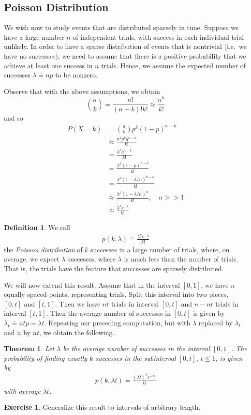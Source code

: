 \documentclass[12pt]{amsbook}
\theoremstyle{plain}
\newtheorem{theorem}{Theorem}
\theoremstyle{definition}
\newtheorem*{definition}{Definition}
\newtheorem*{exercise}{Exercise}
\theoremstyle{remark}
\numberwithin{equation}{section}  %
\numberwithin{equation}{section}  %
\begin{document}
\subsection{Poisson Distribution}
We wish now to study events that are distributed sparsely in time.
Suppose we have a large number $n$ of independent trials, with
success in each individual trial unlikely. In order to have a sparse
distribution of events that is nontrivial (i.e.\ we have no successes),
we need to assume that there is a positive
probability that we achieve at least one success in $n$ trials. Hence, we 
assume the expected number of
successes $\lambda \doteq np$ to be nonzero.

Observe that with the above assumptions, we obtain
\begin{equation*}
	\binom{n}{k} = \frac{n!}{(n-k)! k!} \approx \frac{n^k}{k!}
\end{equation*}
and so
\begin{align*}
	P(X = k)
	& = \binom{n}{k} p^k {(1 - p)}^{n-k} \\
	& \approx \frac{n^k p^k q^{n-k}}{k!} \\
	& = \frac{\lambda^k q^{n-k}}{k!} \\
	& = \frac{\lambda^k {(1-p)}^{n-k}}{k!} \\
	& = \frac{\lambda^k {(1-\lambda/n)}^{n-k}}{k!} \\
	& \approx \frac{\lambda^k {(1-\lambda/n)}^{n}}{k!} , \quad n >> 1\\
	& \approx \frac{\lambda^k e^{-\lambda}}{k!}
\end{align*}
\begin{definition}
	We call
	\begin{align*}
		p(k, \lambda) \doteq \frac{\lambda^k e^{-\lambda}}{k!}
	\end{align*}
	the \emph{Poisson distribution} of $k$ successes in a large number
	of trials, where, on average, we expect $\lambda$ successes,
	where $\lambda$ is much less than the number of trials.
	That is, the trials have the feature that successes are
	sparsely distributed.
\end{definition}
We will now extend this result. Assume that in the interval $[0,1]$,
we have $n$ equally spaced points, representing trials. Split this interval 
into two pieces,
$[0,t]$ and $[t, 1]$. Then we have $nt$ trials in interval $[0,t]$ and
$n - nt$ trials in interval $[t,1]$. Then the average number of successes
in $[0,t]$ is given by $\lambda_t \doteq n t p = \lambda t$. Repeating
our preceding computation, but with $\lambda$ replaced by $\lambda_t$
and $n$ by $nt$, we obtain the following.
\begin{theorem}
	Let $\lambda$ be the average number of successes in the interval $[0,1]$.
	The probability of finding exactly $k$ successes  in the subinterval 
	$[0,t]$,
	$t \le 1$, is given by
	\begin{align*}
		p(k, \lambda t) = \frac{{(\lambda t)}^{k} e^{-\lambda t}}{k!}
	\end{align*}
	with average $\lambda t$.
\end{theorem}
\begin{exercise}
	Generalize this result to intervals of arbitrary length.
\end{exercise}
\end{document}

